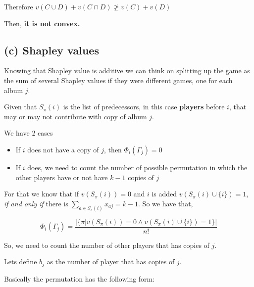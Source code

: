 \documentclass[12pt, a4paper]{article}
\begin{document}
Therefore $v(C \cup D) + v(C \cap D) \ngeq v(C) + v(D)$

Then, \textbf{it is not convex.}

\subsection{(c) Shapley values}
Knowing that Shapley value is additive we can think on splitting up the game as the sum of several
Shapley values if they were different games, one for each album $j$.

Given that $S_{\pi}(i)$ is the list of predecessors, in this case \textbf{players} before $i$, that may or may not contribute with copy of album $j$.

We have 2 cases 
\begin{itemize}
  \item If $i$ does not have a copy of $j$, then $\Phi_i(\Gamma_j) = 0$
  \item If $i$ does, we need to count the number of possible permutation in which the other players have or not have $k-1$ copies of $j$
\end{itemize}

For that we know that if $v(S_{\pi}(i)) = 0$ and $i$ is added $v(S_{\pi}(i) \cup \{i\}) = 1$, \textit{if and only if} there is
$\sum_{a \in S_{\pi}(i)} x_{aj} = k - 1$. So we have that,

\begin{equation}
  \Phi_i(\Gamma_j) = \frac{|\{\pi | v(S_{\pi}(i)) = 0 \land v(S_{\pi}(i) \cup \{i\}) = 1\}|}{n!}
\end{equation}

So, we need to count the number of other players that has copies of $j$.

Lets define $b_j$ as the number of player that has copies of $j$.

Basically the permutation has the following form:

\begin{center}
\end{center}
\end{document}
